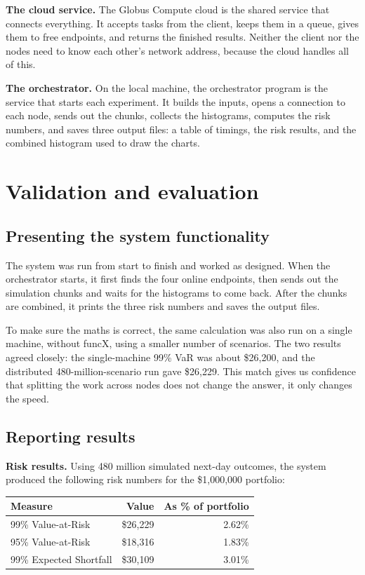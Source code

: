 \documentclass[11pt,a4paper]{article}
\begin{document}
\textbf{The cloud service.} The Globus Compute cloud is the shared service that connects everything. It accepts tasks from the client, keeps them in a queue, gives them to free endpoints, and returns the finished results. Neither the client nor the nodes need to know each other's network address, because the cloud handles all of this.

\textbf{The orchestrator.} On the local machine, the orchestrator program is the service that starts each experiment. It builds the inputs, opens a connection to each node, sends out the chunks, collects the histograms, computes the risk numbers, and saves three output files: a table of timings, the risk results, and the combined histogram used to draw the charts.

\section{Validation and evaluation}

\subsection{Presenting the system functionality}

The system was run from start to finish and worked as designed. When the orchestrator starts, it first finds the four online endpoints, then sends out the simulation chunks and waits for the histograms to come back. After the chunks are combined, it prints the three risk numbers and saves the output files.

To make sure the maths is correct, the same calculation was also run on a single machine, without funcX, using a smaller number of scenarios. The two results agreed closely: the single-machine 99\% VaR was about \$26,200, and the distributed 480-million-scenario run gave \$26,229. This match gives us confidence that splitting the work across nodes does not change the answer, it only changes the speed.

\subsection{Reporting results}

\textbf{Risk results.} Using 480 million simulated next-day outcomes, the system produced the following risk numbers for the \$1,000,000 portfolio:

\begin{table}[H]
\centering
\begin{tabular}{lrr}
\toprule
Measure & Value & As \% of portfolio \\
\midrule
99\% Value-at-Risk & \$26,229 & 2.62\% \\
95\% Value-at-Risk & \$18,316 & 1.83\% \\
99\% Expected Shortfall & \$30,109 & 3.01\% \\
\bottomrule
\end{tabular}
\end{table}
\end{document}
